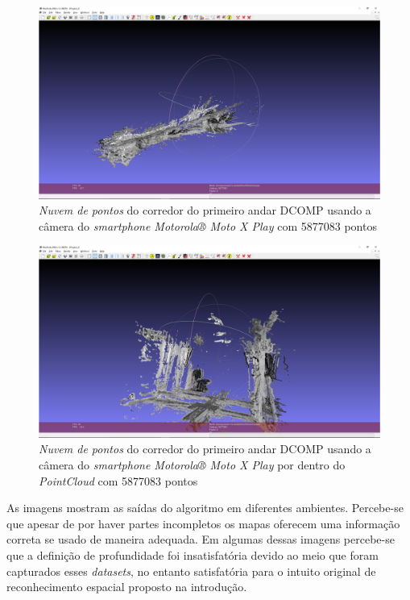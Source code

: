 \begin{figure}[H]
	\centering
		\includegraphics[width= \textwidth]{Imagens/corredorMotox.PNG}
	\caption{\textit{Nuvem de pontos} do corredor do primeiro andar DCOMP usando a câmera do \textit{smartphone Motorola® Moto X Play} com 5877083 pontos}
\end{figure}

\begin{figure}[H]
	\centering
		\includegraphics[width= \textwidth]{Imagens/corredorMotoxdentro.PNG}
	\caption{\textit{Nuvem de pontos} do corredor do primeiro andar DCOMP usando a câmera do \textit{smartphone Motorola® Moto X Play} por dentro do \textit{PointCloud} com 5877083 pontos}
\end{figure}

As imagens mostram as saídas do algoritmo em diferentes ambientes. Percebe-se que apesar de por haver partes incompletos os mapas oferecem uma informação correta se usado de maneira adequada. Em algumas dessas imagens percebe-se que a definição de profundidade foi insatisfatória devido ao meio que foram capturados esses \textit{datasets}, no entanto satisfatória para o intuito original de reconhecimento espacial proposto na introdução.

